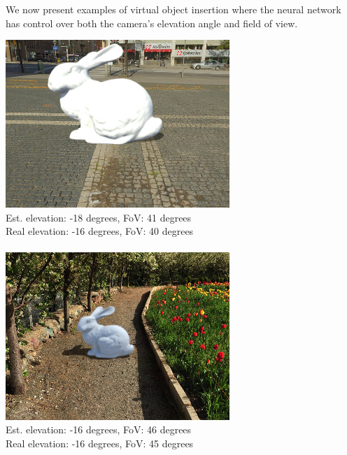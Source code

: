 We now present examples of virtual object insertion where the neural
network has control over both the camera's elevation angle and field of
view.

\begin{multicols}{2}

\includegraphics[width=\mywidth]{pano_aizkyyutyizoaz.jpg}\\
\small Est. elevation: -18 degrees, FoV: 41 degrees\\
\small Real elevation: -16 degrees, FoV: 40 degrees\\
~\\
\includegraphics[width=\mywidth]{pano_ajlwcdjsjcaemh_002.jpg}\\
\small Est. elevation: -16 degrees, FoV: 46 degrees\\
\small Real elevation: -16 degrees, FoV: 45 degrees\\


\end{multicols}
